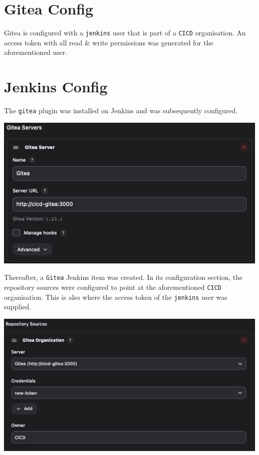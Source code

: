 \section{Gitea Config}
Gitea is configured with a \verb|jenkins| user that is part of a \verb|CICD| organisation.
An access token with all read \& write permissions was generated for the aforementioned user.
\section{Jenkins Config}
The \verb|gitea| plugin was installed on Jenkins and was subsequently configured.

\begin{center}
	\includegraphics[width=.75\textwidth]{assets/gitea-servers}
\end{center}

\noindent Thereafter, a \verb|Gitea| Jenkins item was created. In its configuration section,
the repository sources were configured to point at the aforementioned \verb|CICD|
organisation. This is also where the access token of the \verb|jenkins| user was
supplied.

\begin{center}
	\includegraphics[width=.75\textwidth]{assets/repo-sources}
\end{center}

